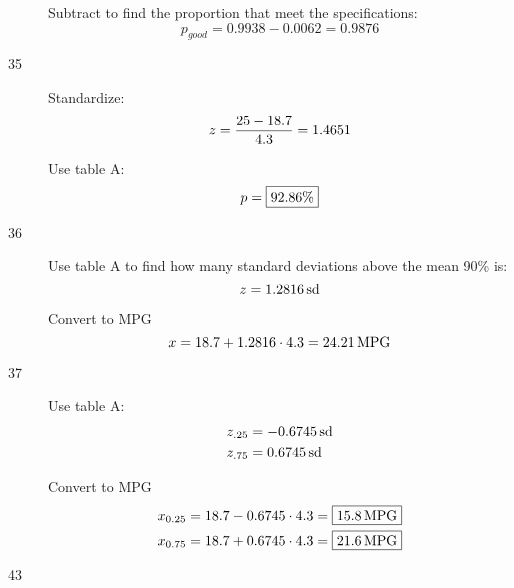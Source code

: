 \documentclass[letterpaper, landscape]{exam}
\begin{document}
\begin{description}
\begin{parts}
              Subtract to find the proportion that meet the specifications:
              \[
                p_{good} = 0.9938 - 0.0062 = \boxed{ 0.9876 }
              \]

        \end{parts}

      \item[35]
        Standardize:
        \[
          z = \frac{25 - 18.7}{4.3} = 1.4651 \\
        \]

        Use table A: 
        \[
          p = \boxed{ 92.86 \% } \\
        \]

      \item[36]
        Use table A to find how many standard deviations above the mean 90\% is: 
        \[
          z = \unit[1.2816]{sd}
        \]

        Convert to MPG
        \[
          x = 18.7 + 1.2816 \cdot 4.3 = \unit[24.21]{MPG}
        \]

      \item[37]
        Use table A: 
        \begin{align*}
          z_{.25} &= \unit[-0.6745]{sd} \\
          z_{.75} &= \unit[0.6745]{sd} \\
        \end{align*}

        Convert to MPG
        \begin{align*}
          x_{0.25} &= 18.7 - 0.6745 \cdot 4.3 = \boxed{ \unit[15.8]{MPG} } \\
          x_{0.75} &= 18.7 + 0.6745 \cdot 4.3 = \boxed{ \unit[21.6]{MPG} } \\
        \end{align*}

      \item[43]
\end{description}
\end{document}
